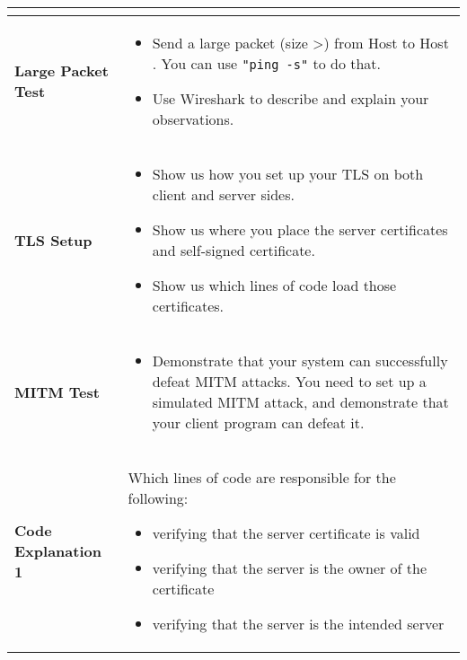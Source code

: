 \begin{longtable}{|p{}|p{}|}
\begin{itemize}[topsep=-0.5cm,leftmargin=0.4cm]
	\end{itemize}
 \\ 
 \hline

 \textbf{Large Packet Test} & 
 	\vspace*{-0.3cm}
 	\begin{itemize}[topsep=-0.5cm,leftmargin=0.4cm]
	\item Send a large packet (size \textgreater\space 3000) from Host \hostu to Host \hostv. 
	You can use \texttt{"ping -s"} to do that. 

	\item Use Wireshark to describe and explain your observations.
	\end{itemize}
 \\ 
 \hline

 \textbf{TLS Setup} & 
 	\vspace*{-0.3cm}
 	\begin{itemize}[topsep=-0.5cm,leftmargin=0.4cm]
		\item Show us how you set up your TLS on both client and server sides.
		\item Show us where you place the server certificates and self-signed certificate.
		\item Show us which lines of code load those certificates.
	\end{itemize}
 \\ 
 \hline

 \textbf{MITM Test} & 
 	\vspace*{-0.3cm}
 	\begin{itemize}[topsep=-0.5cm,leftmargin=0.4cm]
		\item Demonstrate that your system can successfully defeat MITM attacks. You
		need to set up a simulated MITM attack, and demonstrate that your client
		program can defeat it.
	\end{itemize}
 \\ 
 \hline

 \textbf{Code Explanation 1} & 
	Which lines of code are responsible for the following:
 	\vspace*{0.2cm}
 	\begin{itemize}[topsep=-0.5cm,leftmargin=0.4cm]
		\item verifying that the server certificate is valid
		\item verifying that the server is the owner of the certificate
		\item verifying that the server is the intended server
	\end{itemize}
 \\ 
 \hline


\end{longtable}
